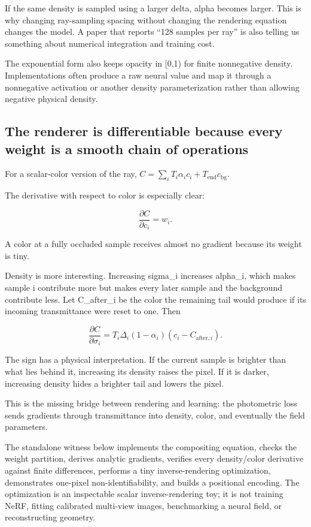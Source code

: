 If the same density is sampled using a larger delta, alpha becomes larger. This is why changing ray-sampling spacing without changing the rendering equation changes the model. A paper that reports ``128 samples per ray'' is also telling us something about numerical integration and training cost.

The exponential form also keeps opacity in {[}0,1) for finite nonnegative density. Implementations often produce a raw neural value and map it through a nonnegative activation or another density parameterization rather than allowing negative physical density.

\subsection{The renderer is differentiable because every weight is a smooth chain of operations}\label{04-visual-computing-ii-ch035-the-renderer-is-differentiable-because-every-weight-is-a-smooth-chain-of-operations}

For a scalar-color version of the ray, \(C=\sum_iT_i\alpha_ic_i+T_{\mathrm{end}}c_{\mathrm{bg}}\).

The derivative with respect to color is especially clear:

\[\frac{\partial C}{\partial c_i}=w_i.\]

A color at a fully occluded sample receives almost no gradient because its weight is tiny.

Density is more interesting. Increasing sigma\_i increases alpha\_i, which makes sample i contribute more but makes every later sample and the background contribute less. Let C\_after\_i be the color the remaining tail would produce if its incoming transmittance were reset to one. Then

\[\frac{\partial C}{\partial\sigma_i}=T_i\Delta_i(1-\alpha_i)(c_i-C_{\mathrm{after},i}).\]

The sign has a physical interpretation. If the current sample is brighter than what lies behind it, increasing its density raises the pixel. If it is darker, increasing density hides a brighter tail and lowers the pixel.

This is the missing bridge between rendering and learning: the photometric loss sends gradients through transmittance into density, color, and eventually the field parameters.

The standalone witness below implements the compositing equation, checks the weight partition, derives analytic gradients, verifies every density/color derivative against finite differences, performs a tiny inverse-rendering optimization, demonstrates one-pixel non-identifiability, and builds a positional encoding. The optimization is an inspectable scalar inverse-rendering toy; it is not training NeRF, fitting calibrated multi-view images, benchmarking a neural field, or reconstructing geometry.


